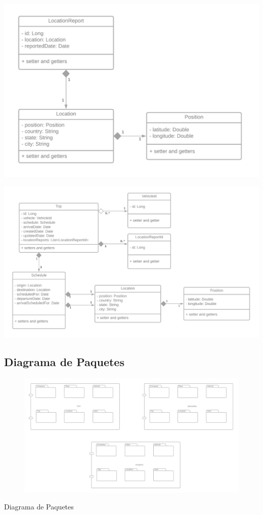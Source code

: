 \documentclass{article}
\begin{document}
\begin{center}
    \includegraphics[scale=.2]{pics/c4.png}%
\end{center}
\begin{center}
    \includegraphics[scale=.15]{pics/c5.png}%
\end{center}

\subsection{Diagrama de Paquetes}
\begin{center}
\begin{figure}[h]
    \centering
    \includegraphics[scale=.1]{pics/paquetes.png}%
    \label{fig:paquetes}\end{figure}
    \large{Diagrama de Paquetes}
\end{center}
\end{document}
